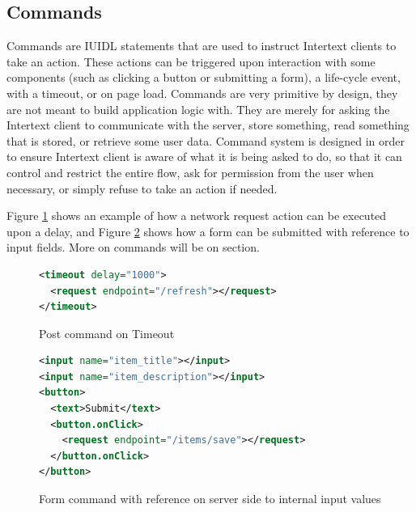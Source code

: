 \subsection{Commands}

Commands are IUIDL statements that are used to instruct Intertext clients to take an action. These actions can be triggered upon interaction with some components (such as clicking a button or submitting a form), a life-cycle event, with a timeout, or on page load. Commands are very primitive by design, they are not meant to build application logic with. They are merely for asking the Intertext client to communicate with the server, store something, read something that is stored, or retrieve some user data. Command system is designed in order to ensure Intertext client is aware of what it is being asked to do, so that it can control and restrict the entire flow, ask for permission from the user when necessary, or simply refuse to take an action if needed. 

Figure \ref{fig:ex_cmd_post_timeout} shows an example of how a network request action can be executed upon a delay, and Figure \ref{fig:ex_cmd_form} shows how a form can be submitted with reference to input fields. More on commands will be on  section.

\begin{figure}
\begin{minipage}{\linewidth}
\begin{lstlisting}[language=xml]
<timeout delay="1000">
  <request endpoint="/refresh"></request>
</timeout>
\end{lstlisting}
\end{minipage}
\caption{Post command on Timeout}%
\label{fig:ex_cmd_post_timeout}%
\end{figure}

\begin{figure}
\begin{minipage}{\linewidth}
\begin{lstlisting}[language=xml]
<input name="item_title"></input>
<input name="item_description"></input>
<button>
  <text>Submit</text>
  <button.onClick>
    <request endpoint="/items/save"></request>
  </button.onClick>
</button>
\end{lstlisting}
\end{minipage}
\caption{Form command with reference on server side to internal input values}%
\label{fig:ex_cmd_form}%
\end{figure}

